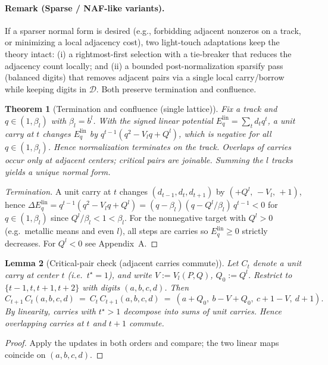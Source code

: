 \documentclass[11pt]{article}
\newtheorem{theorem}{Theorem}[section]
\newtheorem{lemma}[theorem]{Lemma}
\theoremstyle{definition}
\theoremstyle{remark}
\begin{document}
\paragraph{Remark (Sparse / NAF-like variants).}
If a sparser normal form is desired (e.g., forbidding adjacent nonzeros on a track, or minimizing a local adjacency cost), two light-touch adaptations keep the theory intact:
(i) a rightmost-first selection with a tie-breaker that reduces the adjacency count locally; and
(ii) a bounded post-normalization sparsify pass (balanced digits) that removes adjacent pairs via a single local carry/borrow while keeping digits in $\mathcal D$.
Both preserve termination and confluence.

\begin{theorem}[Termination and confluence (single lattice)]\label{thm:terminate}
Fix a track and $q\in(1,\beta_l)$ with $\beta_l=b^l$. With the \emph{signed} linear potential $E_q^{\mathrm{lin}}=\sum_t d_t q^t$, a unit carry at $t$ changes $E_q^{\mathrm{lin}}$ by
$q^{t-1}(q^2 - V_l q + Q^l)$, which is negative for all $q\in(1,\beta_l)$.
Hence normalization terminates on the track. Overlaps of carries occur only at adjacent centers; critical pairs are joinable. Summing the $l$ tracks yields a unique normal form.
\end{theorem}

\begin{proof}[Termination]
A unit carry at $t$ changes $(d_{t-1},d_t,d_{t+1})$ by $(+Q^l,\,-V_l,\,+1)$, hence
\(
\Delta E_q^{\mathrm{lin}}=q^{t-1}(q^2 - V_l q + Q^l)=(q-\beta_l)(q-Q^l/\beta_l)\,q^{t-1}<0
\)
for $q\in(1,\beta_l)$ since $Q^l/\beta_l<1<\beta_l$.
For the nonnegative target with $Q^l>0$ (e.g.\ metallic means and even $l$), all steps are carries so $E_q^{\mathrm{lin}}\ge0$ strictly decreases.
For $Q^l<0$ see Appendix~A.
\end{proof}

\begin{lemma}[Critical-pair check (adjacent carries commute)]\label{lem:commute}
Let $C_t$ denote a unit carry at center $t$ (i.e.\ $t^\star=1$), and write $V:=V_l(P,Q)$, $Q_0:=Q^l$.
Restrict to $\{t-1,t,t+1,t+2\}$ with digits $(a,b,c,d)$. Then
\[
C_{t+1}\,C_t(a,b,c,d)\ =\ C_t\,C_{t+1}(a,b,c,d)\ =\ (a+Q_0,\ b-V+Q_0,\ c+1-V,\ d+1).
\]
By linearity, carries with $t^\star>1$ decompose into sums of unit carries. Hence overlapping carries at $t$ and $t{+}1$ commute.
\end{lemma}

\begin{proof}
Apply the updates in both orders and compare; the two linear maps coincide on $(a,b,c,d)$.
\end{proof}
\end{document}
